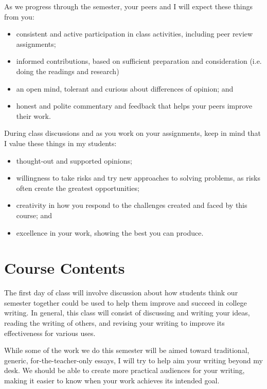 \documentclass[11pt,oneside]{amsart}	%
\begin{document}
As we progress through the semester, your peers and I will expect these things from you:
\begin{itemize}
	\item consistent and active participation in class activities, including peer review assignments;
	\item informed contributions, based on sufficient preparation and consideration (i.e. doing the readings and research)
	\item an open mind, tolerant and curious about differences of opinion; and
	\item honest and polite commentary and feedback that helps your peers improve their work.
\end{itemize}

During class discussions and as you work on your assignments, keep in mind that I value these things in my students:
\begin{itemize}
	\item thought-out and supported opinions;
	\item willingness to take risks and try new approaches to solving problems, as risks often create the greatest opportunities;
	\item creativity in how you respond to the challenges created and faced by this course; and
	\item excellence in your work, showing the best you can produce.
\end{itemize}




\section{Course Contents} %
\label{sec:course_contents}

The first day of class will involve discussion about how students think our semester together could be used to help them improve and succeed in college writing. In general, this class will consist of discussing and writing your ideas, reading the writing of others, and revising your writing to improve its effectiveness for various uses. 

While some of the work we do this semester will be aimed toward traditional, generic, for-the-teacher-only essays, I will try to help aim your writing beyond my desk. We should be able to create more practical audiences for your writing, making it easier to know when your work achieves its intended goal.
\end{document}
